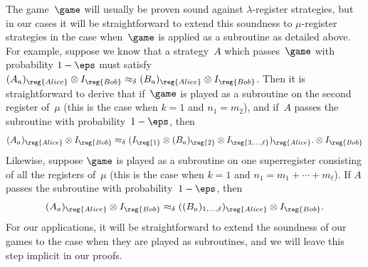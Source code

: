 The game~$\game$ will usually be proven sound against $\lambda$-register strategies,
but in our cases it will be straightforward to extend this soundness to $\mu$-register strategies
in the case when~$\game$ is applied as a subroutine as detailed above.
For example, suppose we know that a strategy~$A$ which passes~$\game$
with probability $1-\eps$ must satisfy
$(A_a)_{\reg{Alice}} \otimes I_{\reg{Bob}} \approx_{\delta} (B_a)_{\reg{Alice}} \otimes I_{\reg{Bob}}$.
Then it is straightforward to derive that if~$\game$ is played as a subroutine on the second register of~$\mu$
(this is the case when $k = 1$ and $n_1 = m_2$), and if~$A$ passes the subroutine with probability~$1-\eps$, then
\begin{equation*}
(A_a)_{\reg{Alice}} \otimes I_{\reg{Bob}} \approx_{\delta} (I_{\reg{1}} \otimes (B_a)_{\reg{2}} \otimes I_{\reg{3, \ldots, \ell}})_{\reg{Alice}}.\otimes I_{\reg{Bob}}
\end{equation*}
Likewise, suppose $\game$ is played as a subroutine on one superregister consisting of all the registers of~$\mu$
(this is the case when $k = 1$ and $n_1 = m_1 + \cdots + m_\ell$).
If $A$ passes the subroutine with probability~$1-\eps$, then
\begin{equation*}
(A_a)_{\reg{Alice}} \otimes I_{\reg{Bob}} \approx_{\delta} ((B_a)_{1, \ldots,\ell} )_{\reg{Alice}} \otimes I_{\reg{Bob}}.
\end{equation*}
For our applications, it will be straightforward to
extend the soundness of our games to the case when they are played as subroutines,
and we will leave this step implicit in our proofs.



